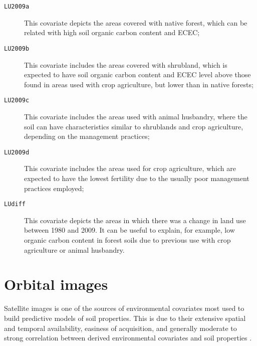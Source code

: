 \begin{description}
  \item[\texttt{LU2009a}] This covariate depicts the areas covered with native forest, which can be related with high soil organic carbon content and ECEC;
  
  \item[\texttt{LU2009b}] This covariate includes the areas covered with shrubland, which is expected to have soil organic carbon content and ECEC level above those found in areas used with crop agriculture, but lower than in native forests;
  
  \item[\texttt{LU2009c}] This covariate includes the areas used with animal husbandry, where the soil can have characteristics similar to shrublands and crop agriculture, depending on the management practices;
  
  \item[\texttt{LU2009d}] This covariate includes the areas used for crop agriculture, which are expected to have the lowest fertility due to the usually poor management practices employed;
  
  \item[\texttt{LUdiff}] This covariate depicts the areas in which there was a change in land use between 1980 and 2009. It can be useful to explain, for example, low organic carbon content in forest soils due to previous use with crop agriculture or animal husbandry.
\end{description}

\tocless\section{Orbital images}
\label{sec:covar-data-sat-image}

Satellite images is one of the sources of environmental covariates most used to build predictive models of soil properties. This is due to their extensive spatial and temporal availability, easiness of acquisition, and generally moderate to strong correlation between derived environmental covariates and soil properties \cite{BishopEtAl2001, Grunwald2009}.

